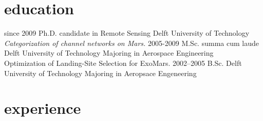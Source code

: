\documentclass[]{friggeri-cv}
\begin{document}
\section{education}

\begin{entrylist}
  \entry
    {since 2009}
    {Ph.D. {\normalfont candidate in Remote Sensing}}
    {Delft University of Technology}
    {\emph{Categorization of channel networks on Mars.}}
  \entry
    {2005-2009}
    {M.Sc. summa cum laude}
    {Delft University of Technology}
    {Majoring in Aerospace Engineering\\
    Optimization of Landing-Site Selection for ExoMars.}
  \entry
    {2002–2005}
    {B.Sc.}
    {Delft University of Technology}
    {Majoring in Aeropsace Engeneering}
\end{entrylist}

\section{experience}
\end{document}
